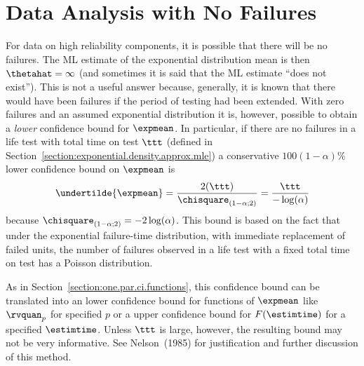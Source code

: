 \section{Data Analysis with No Failures}
\label{section:expon.zero.fail}
For data on high reliability components, it is possible that
there will be no failures. The ML estimate of the exponential
distribution mean is then $\thetahat=\infty$ (and
sometimes it is said that the ML estimate ``does not exist'').  This
is not a useful answer because, generally, it is known that there would
have been failures if the period of testing had been extended. With
zero failures and an assumed exponential distribution it is, however,
possible to obtain a {\em lower} confidence bound for $\expmean$.  In
particular, if there are no failures in a life test with 
total time on test $\ttt$ (defined in
Section~\ref{section:exponential.density.approx.mle}) a conservative
$100(1-\alpha)$\% lower confidence bound on $\expmean$ is
\begin{equation}
\label{equation:zero.failures.exp.ci}
\undertilde{\expmean} = \frac{2 (\ttt)}{ \chisquare_{(1-\alpha;2)}}
	 = \frac{\ttt}{ -\log(\alpha) }
\end{equation}
because $ \chisquare_{(1-\alpha;2)} = - 2 \log(\alpha) $.
This bound is based on the fact that under the exponential
failure-time distribution, with immediate replacement of failed
units, the number of failures observed in a life test with a fixed
total time on test has a Poisson distribution.

As in Section~\ref{section:one.par.ci.functions}, this confidence
bound can be translated into an lower confidence bound for functions
of $\expmean$ like $\rvquan_{p}$ for specified $p$ or a upper
confidence bound for $F(\estimtime)$ for a specified $\estimtime$.
Unless $\ttt$ is large, however, the resulting bound may not be very
informative.  See Nelson~(1985) for justification and further
discussion of this method.

